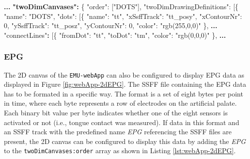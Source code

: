 \documentclass[]{book}
\newenvironment{Shaded}{\begin{snugshade}}{\end{snugshade}}
\newcommand{\DataTypeTok}[1]{\textcolor[rgb]{0.13,0.29,0.53}{#1}}
\newcommand{\DecValTok}[1]{\textcolor[rgb]{0.00,0.00,0.81}{#1}}
\newcommand{\ErrorTok}[1]{\textcolor[rgb]{0.64,0.00,0.00}{\textbf{#1}}}
\newcommand{\FunctionTok}[1]{\textcolor[rgb]{0.00,0.00,0.00}{#1}}
\newcommand{\OtherTok}[1]{\textcolor[rgb]{0.56,0.35,0.01}{#1}}
\newcommand{\StringTok}[1]{\textcolor[rgb]{0.31,0.60,0.02}{#1}}
\theoremstyle{definition}
\theoremstyle{definition}
\theoremstyle{definition}
\theoremstyle{remark}
\begin{document}
\begin{Shaded}
\begin{Highlighting}[]
\ErrorTok{...}
\ErrorTok{"twoDimCanvases":} \FunctionTok{\{}
    \DataTypeTok{"order"}\FunctionTok{:} \OtherTok{[}\StringTok{"DOTS"}\OtherTok{]}\FunctionTok{,}
    \DataTypeTok{"twoDimDrawingDefinitions"}\FunctionTok{:} \OtherTok{[}\FunctionTok{\{}
        \DataTypeTok{"name"}\FunctionTok{:} \StringTok{"DOTS"}\FunctionTok{,}
        \DataTypeTok{"dots"}\FunctionTok{:} \OtherTok{[}\FunctionTok{\{}
            \DataTypeTok{"name"}\FunctionTok{:} \StringTok{"tt"}\FunctionTok{,}
            \DataTypeTok{"xSsffTrack"}\FunctionTok{:} \StringTok{"tt_posy"}\FunctionTok{,}
            \DataTypeTok{"xContourNr"}\FunctionTok{:} \DecValTok{0}\FunctionTok{,}
            \DataTypeTok{"ySsffTrack"}\FunctionTok{:} \StringTok{"tt_posz"}\FunctionTok{,}
            \DataTypeTok{"yContourNr"}\FunctionTok{:} \DecValTok{0}\FunctionTok{,}
            \DataTypeTok{"color"}\FunctionTok{:} \StringTok{"rgb(255,0,0)"}
        \FunctionTok{\}}\OtherTok{,}
\ErrorTok{...}
    \StringTok{"connectLines"}\ErrorTok{:} \OtherTok{[}\FunctionTok{\{}
        \DataTypeTok{"fromDot"}\FunctionTok{:} \StringTok{"tt"}\FunctionTok{,}
        \DataTypeTok{"toDot"}\FunctionTok{:} \StringTok{"tm"}\FunctionTok{,}
            \DataTypeTok{"color"}\FunctionTok{:} \StringTok{"rgb(0,0,0)"}
    \FunctionTok{\}}\OtherTok{,}
\ErrorTok{...}
\end{Highlighting}
\end{Shaded}

\hypertarget{epg}{%
\subsubsection{EPG}\label{epg}}

The 2D canvas of the \texttt{EMU-webApp} can also be configured to
display EPG data as displayed in Figure \ref{fig:webApp-2dEPG}. The SSFF
file containing the EPG data has to be formated in a specific way. The
format is a set of eight bytes per point in time, where each byte
represents a row of electrodes on the artificial palate. Each binary bit
value per byte indicates whether one of the eight sensors is activated
or not (i.e., tongue contact was measured). If data in this format and
an SSFF track with the predefined name \emph{EPG} referencing the SSFF
files are present, the 2D canvas can be configured to display this data
by adding the \emph{EPG} to the \texttt{twoDimCanvases:order} array as
shown in Listing \ref{lst:webApp-2dEPG}.
\end{document}

